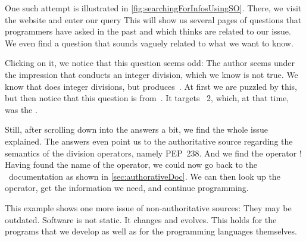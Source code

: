 One such attempt is illustrated in \cref{fig:searchingForInfosUsingSO}.
There, we visit the  website and enter our query \emph{}
This will show us several pages of questions that programmers have asked in the past and which  thinks are related to our issue.
We even find a question that sounds vaguely related to what we want to know.

Clicking on it, we notice that this question seems odd:
The author seems under the impression that \pythonilIdx{/} conducts an integer division, which we know is not true.
We know that \pythonilIdx{//} does integer divisions, but \pythonilIdx{/} produces~.
At first we are puzzled by this, but then notice that this question is from~\citeyear{SE:SO:HTIDWRTIIP}.
It targets \python~2, which, at that time, was the  \python.

Still, after scrolling down into the answers a bit, we find the whole issue explained.
The answers even point us to the authoritative source regarding the semantics of the division operators, namely PEP~238.
And we find the operator !
Having found the name of the operator, we could now go back to the \python\ documentation as shown in \cref{sec:authorativeDoc}.
We can then look up the operator, get the information we need, and continue programming.

This example shows one more issue of non-authoritative sources:
They may be outdated.
Software is not static.
It changes and evolves.
This holds for the programs that we develop as well as for the programming languages themselves.

